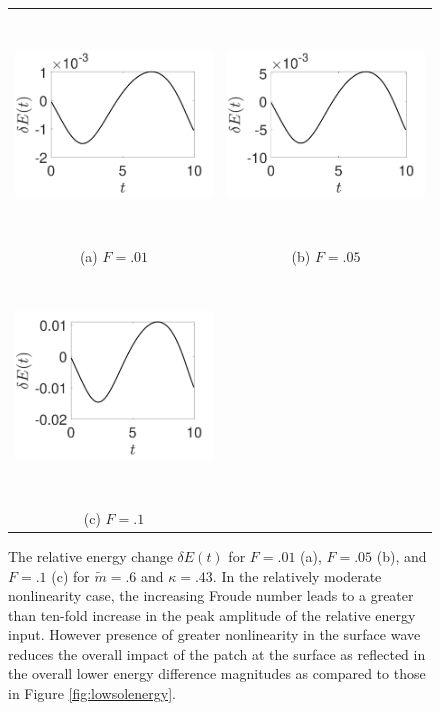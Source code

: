 \documentclass[a4paper,11pt]{article}
\begin{document}
\begin{figure}
\centering
\begin{tabular}{cc}
\includegraphics[width=8cm,height=6cm]{energy_wm_1_modu_pt6} & \includegraphics[width=8cm,height=6cm]{energy_wm_5_modu_pt6} \\
(a) $F=.01$ & (b) $F=.05$\\
 \includegraphics[width=8cm,height=6cm]{energy_wm_10_modu_pt6}\\
 (c) $F=.1$
\end{tabular}
\caption{The relative energy change $\delta E(t)$ for $F=.01$ (a), $F=.05$ (b), and $F=.1$ (c) for $\tilde{m}=.6$ and $\kappa = .43$.  In the relatively moderate nonlinearity case, the increasing Froude number leads to a greater than ten-fold increase in the peak amplitude of the relative energy input.  However presence of greater nonlinearity in the surface wave reduces the overall impact of the patch at the surface as reflected in the overall lower energy difference magnitudes as compared to those in Figure \ref{fig:lowsolenergy}.}
\label{fig:midsolenergy}
\end{figure}
\end{document}
